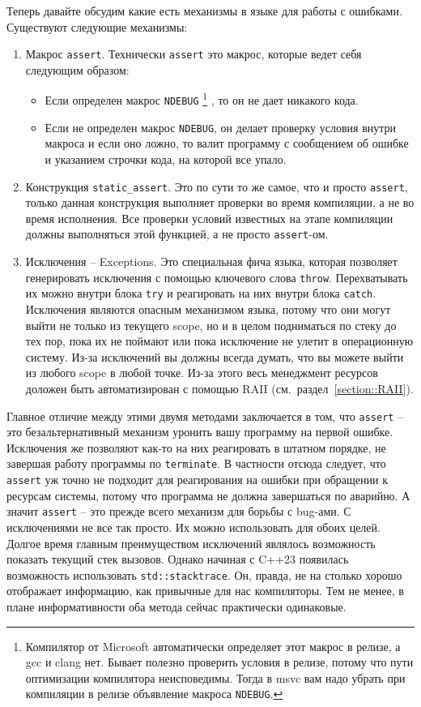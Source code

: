 Теперь давайте обсудим какие есть механизмы в языке для работы с ошибками.
Существуют следующие механизмы:
\begin{enumerate}
\item Макрос \verb"assert".
Технически \verb"assert" это макрос, которые ведет себя следующим образом:
\begin{itemize}
\item Если определен макрос \verb"NDEBUG"%
\footnote{Компилятор от Microsoft автоматически определяет этот макрос в релизе, а gcc и clang нет.
Бывает полезно проверить условия в релизе, потому что пути оптимизации компилятора неисповедимы.
Тогда в msvc вам надо убрать при компиляции в релизе объявление макроса \verb"NDEBUG".} , то он не дает никакого кода.

\item Если не определен макрос \verb"NDEBUG", он делает проверку условия внутри макроса и если оно ложно, то валит программу с сообщением об ошибке и указанием строчки кода, на которой все упало.
\end{itemize}

\item Конструкция \verb"static_assert".
Это по сути то же самое, что и просто \verb"assert", только данная конструкция выполняет проверки во время компиляции, а не во время исполнения.
Все проверки условий известных на этапе компиляции должны выполняться этой функцией, а не просто \verb"assert"-ом.

\item Исключения -- Exceptions.
Это специальная фича языка, которая позволяет генерировать исключения с помощью ключевого слова \verb"throw".
Перехватывать их можно внутри блока \verb"try" и реагировать на них внутри блока \verb"catch".
Исключения являются опасным механизмом языка, потому что они могут выйти не только из текущего scope, но и в целом подниматься по стеку до тех пор, пока их не поймают или пока исключение не улетит в операционную систему.
Из-за исключений вы должны всегда думать, что вы можете выйти из любого scope в любой точке.
Из-за этого весь менеджмент ресурсов доложен быть автоматизирован с помощью RAII (см.~раздел~\ref{section::RAII}).
\end{enumerate}
Главное отличие между этими двумя методами заключается в том, что \verb"assert" -- это безальтернативный механизм уронить вашу программу на первой ошибке.
Исключения же позволяют как-то на них реагировать в штатном порядке, не завершая работу программы по \verb"terminate".
В частности отсюда следует, что \verb"assert" уж точно не подходит для реагирования на ошибки при обращении к ресурсам системы, потому что программа не должна завершаться по аварийно.
А значит \verb"assert" -- это прежде всего механизм для борьбы с bug-ами.
С исключениями не все так просто.
Их можно использовать для обоих целей.
Долгое время главным преимуществом исключений являлось возможность показать текущий стек вызовов.
Однако начиная с C++23 появилась возможность использовать \verb"std::stacktrace".
Он, правда, не на столько хорошо отображает информацию, как привычные для нас компиляторы.
Тем не менее, в плане информативности оба метода сейчас практически одинаковые.

